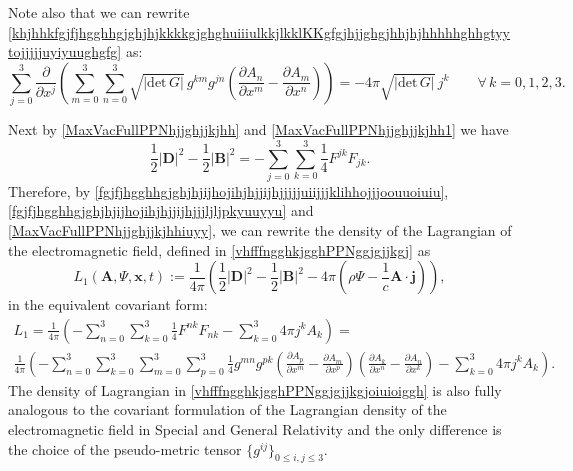 \documentclass{article}
\theoremstyle{definition}
\theoremstyle{remark}
\renewcommand{\vec}[1]{\mathbf{#1}}
\newcommand{\er}{\eqref}
\newcommand{\er}{\eqref}
\begin{document}
Note also that we can rewrite
\er{khjhhkfgjfjhgghhgjghjhjkkkkgjghghuiiiulkkjlkklKKgfgjhjjghgjhhjhjhhhhhghhgtyytojjjjjuyiyuughgfg}
as:
\begin{equation}\label{khjhhkfgjfjhgghhgjghjhjkkkkgjghghuiiiulkkjlkklKKgfgjhjjghgjhhjhjhhhhhghhgtyytojjjjjuyiyuughgfghhj}
\sum_{j=0}^{3}\frac{\partial}{\partial
x^j}\left(\sum_{m=0}^{3}\sum_{n=0}^{3}\sqrt{|\text{det}\,G|}\,g^{km}g^{jn}\left(\frac{\partial
A_n}{\partial x^m}-\frac{\partial A_m}{\partial x^n}\right)\right)
=-4\pi \sqrt{|\text{det}\,G|}\, j^k\quad\quad\forall\, k=0,1,2,3.
\end{equation}








Next by \er{MaxVacFullPPNhjjghjjkjhh} and
\er{MaxVacFullPPNhjjghjjkjhh1} we have
\begin{equation}\label{MaxVacFullPPNhjjghjjkjhhiuyy}
\frac{1}{2}|\vec D|^2-\frac{1}{2}|\vec
B|^2=-\sum_{j=0}^{3}\sum_{k=0}^{3}\frac{1}{4}F^{jk}F_{jk}.
\end{equation}
Therefore, by
\er{fgjfjhgghhgjghjhjijhojihjhjjijhjjjjjuiijjjklihhojjjoouuoiuiu},
\er{fgjfjhgghhgjghjhjijhojihjhjjijhjjjljljpkyuuyyu} and
\er{MaxVacFullPPNhjjghjjkjhhiuyy}, we can rewrite the density of the
Lagrangian of the electromagnetic field, defined in
\er{vhfffngghkjgghPPNggjgjjkgj} as
\begin{equation}\label{vhfffngghkjgghPPNggjgjjkgjoiui}
L_1\left(\vec A,\Psi,\vec
x,t\right):=\frac{1}{4\pi}\left(\frac{1}{2}\left|\vec
D\right|^2-\frac{1}{2}\left|\vec
B\right|^2-4\pi\left(\rho\Psi-\frac{1}{c}\vec A\cdot\vec
j\right)\right),
\end{equation}
in the equivalent covariant form:
\begin{multline}\label{vhfffngghkjgghPPNggjgjjkgjoiuioiggh}
L_1=\frac{1}{4\pi}\left(-\sum_{n=0}^{3}\sum_{k=0}^{3}\frac{1}{4}F^{nk}F_{nk}-\sum_{k=0}^{3}4\pi
j^k A_k\right)=\\
\frac{1}{4\pi}\left(-\sum_{n=0}^{3}\sum_{k=0}^{3}\sum_{m=0}^{3}\sum_{p=0}^{3}\frac{1}{4}g^{mn}g^{pk}\left(\frac{\partial
A_p}{\partial x^m}-\frac{\partial A_m}{\partial
x^p}\right)\left(\frac{\partial A_k}{\partial x^n}-\frac{\partial
A_n}{\partial x^k}\right)-\sum_{k=0}^{3}4\pi j^k A_k\right).
\end{multline}
The density of Lagrangian in
\er{vhfffngghkjgghPPNggjgjjkgjoiuioiggh} is also fully analogous to
the covariant formulation of the Lagrangian density of the
electromagnetic field in Special and General Relativity and the only
difference is the choice of the pseudo-metric tensor
$\{g^{ij}\}_{0\leq i,j\leq 3}$.
\end{document}
